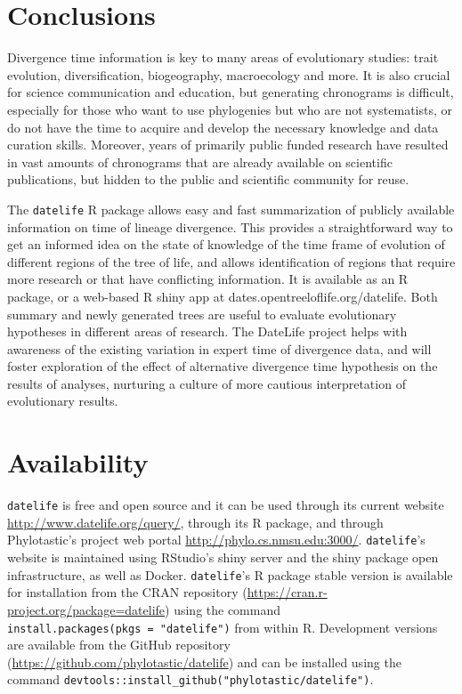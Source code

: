 \documentclass[
  english,
  man]{apa6}
\begin{document}
\hypertarget{conclusions}{%
\section{Conclusions}\label{conclusions}}

Divergence time information is key to many areas of evolutionary studies: trait evolution,
diversification, biogeography, macroecology and more. It is also crucial for science communication and education, but generating chronograms is difficult,
especially for those who want to use phylogenies but who are not systematists, or
do not have the time to acquire and develop the necessary knowledge and data curation skills. Moreover, years of primarily public funded research have resulted in vast amounts of chronograms that are already available on scientific publications, but hidden to the public and scientific community for reuse.

The \texttt{datelife} R package allows easy and fast summarization of publicly available information
on time of lineage divergence. This provides a straightforward way to get an informed idea on the state of knowledge of the time frame of evolution of different regions of the tree of life, and allows identification of regions that require more research or that have conflicting information.
It is available as an R package, or a web-based R shiny app at dates.opentreeloflife.org/datelife.
Both summary and newly generated trees are useful to evaluate evolutionary hypotheses in different areas of research. The DateLife project helps with awareness of the existing variation in expert time of divergence data, and will foster exploration of the effect of alternative divergence time hypothesis on the results of analyses, nurturing a culture of more cautious interpretation of evolutionary results.

\hypertarget{availability}{%
\section{Availability}\label{availability}}

\texttt{datelife} is free and open source and it can be used through its current website
\url{http://www.datelife.org/query/}, through its R package, and through Phylotastic's project web portal \url{http://phylo.cs.nmsu.edu:3000/}.
\texttt{datelife}'s website is maintained using RStudio's shiny server and the shiny package open infrastructure, as well as Docker.
\texttt{datelife}'s R package stable version is available
for installation from the CRAN repository (\url{https://cran.r-project.org/package=datelife})
using the command \texttt{install.packages(pkgs\ =\ "datelife")} from within R. Development versions
are available from the GitHub repository (\url{https://github.com/phylotastic/datelife})
and can be installed using the command \texttt{devtools::install\_github("phylotastic/datelife")}.
\end{document}
